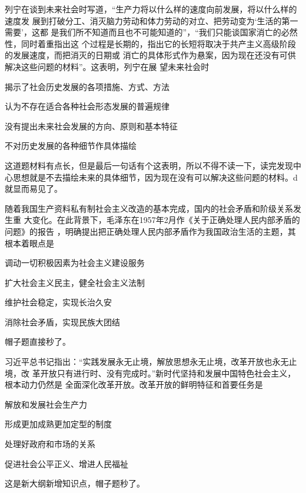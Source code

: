 \documentclass[lang=cn,blue,10pt,scheme=chinese,twocol]{zznote}
\begin{document}
\begin{exercise}列宁在谈到未来社会时写道，“生产力将以什么样的速度向前发展，将以什么样的速度发 展到打破分工、消灭脑力劳动和体力劳动的对立、把劳动变为‘生活的第一 需要’，这都 是我们所不知道而且也不可能知道的”，“我们只能谈国家消亡的必然性，同时着重指出这 个过程是长期的，指出它的长短将取决于共产主义高级阶段的发展速度，而把消灭的日期或 消亡的具体形式作为悬案，因为现在还没有可供解决这些问题的材料”。这表明，列宁在展 望未来社会时
	\begin{choice}
		\item 揭示了社会历史发展的各项措施、方式、方法
		\item 认为不存在适合各种社会形态发展的普遍规律
		\item 没有提出未来社会发展的方向、原则和基本特征
		\item 不对历史发展的各种细节作具体描绘
	\end{choice}
\end{exercise}
\begin{solution}
	​这道题材料有点长，但是最后一句话有个这表明，所以不得不读一下，读完发现中心思想就是不去描绘未来的具体细节，因为现在没有可以解决这些问题的材料。d就显而易见了。
\end{solution}


\begin{exercise}随着我国生产资料私有制社会主义改造的基本完成，国内的社会矛盾和阶级关系发 生重 大变化。在此背景下，毛泽东在1957年2月作《关于正确处理人民内部矛盾的问题》的报告 ，明确提出把正确处理人民内部矛盾作为我国政治生活的主题，其根本着眼点是
	\begin{choice}
		\item 调动一切积极因素为社会主义建设服务
		\item 扩大社会主义民主，健全社会主义法制
		\item 维护社会稳定，实现长治久安
		\item 消除社会矛盾，实现民族大团结
	\end{choice}
\end{exercise}
\begin{solution}
	帽子题直接秒了。
\end{solution}


\begin{exercise} 习近平总书记指出：“实践发展永无止境，解放思想永无止境，改革开放也永无止境，改 革开放只有进行时、没有完成时。”新时代坚持和发展中国特色社会主义，根本动力仍然是 全面深化改革开放。改革开放的鲜明特征和首要任务是
	\begin{choice}
		\item 解放和发展社会生产力
		\item 形成更加成熟更加定型的制度
		\item 处理好政府和市场的关系
		\item 促进社会公平正义、增进人民福祉
	\end{choice}
\end{exercise}
\begin{solution}
	这是新大纲新增知识点，帽子题秒了。
\end{solution}
\end{document}
